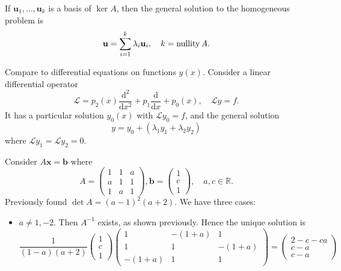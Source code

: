 \documentclass[a4paper]{article}
\begin{document}
    If $ \mathbf{u}_1,\dots,\mathbf{u}_k $ is a basis of $ \ker A $,
    then the general solution to the homogeneous problem is
    \[
      \mathbf{u}= \sum_{i=1}^{k}\lambda_i \mathbf{u}_i, \quad k=\operatorname{nullity} A
    .\]
    \begin{remark}
      Compare to differential equations on functions $y(x)$. Consider
      a linear differential operator
      \[
        \mathcal{L}= p_2(x)\frac{\mathrm{d}^2}{\mathrm{d}x^2}+p_1
        \frac{\mathrm{d}}{\mathrm{d}x} +p_0(x),\quad \mathcal{L} y=f
      .\]
      It has a particular solution $y_0(x)$ with $ \mathcal{L} y_0=f
      $, and the general solution
      \[
        y=y_0+(\lambda_1 y_1+\lambda_2 y_2)
      \]
      where $\mathcal{L} y_1=\mathcal{L} y_2=0$.
    \end{remark}
    \begin{example}
      Consider $A\mathbf{x}=\mathbf{b}$ where
      \[
        A=
        \begin{pmatrix}
          1&1&a\\
          a&1&1\\
          1&a&1
        \end{pmatrix}, \mathbf{b}=
        \begin{pmatrix}
          1\\c\\1
        \end{pmatrix},\quad a,c\in \mathbb{R}.
      \]
      Previously found $ \det A=(a-1)^2(a+2) $. We have three cases:
      \begin{itemize}
        \item \underline{$a\neq 1,-2$}. Then $A^{-1}$ exists, as
          shown previously. Hence the unique solution is
          \[
            \frac{1}{(1-a)(a+2)}
            \begin{pmatrix}
              1\\c\\1
            \end{pmatrix}
            \begin{pmatrix}
              1&-(1+a) & 1 \\
              1 & 1&-(1+a) \\
              -(1+a)& 1 & 1
            \end{pmatrix}
            =
            \begin{pmatrix}
              2-c-ca\\c-a\\c-a
            \end{pmatrix}
\]
\end{itemize}
\end{example}
\end{document}
